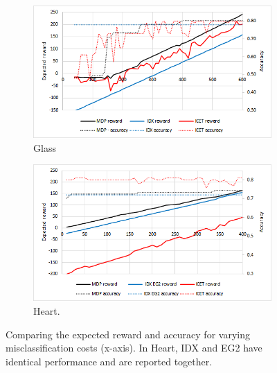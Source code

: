 \documentclass[letterpaper]{article}
\theoremstyle{definition}
\begin{document}
\begin{figure}[!ht]
	\centering
	\begin{subfigure}[t]{0.5\textwidth}\vskip 0pt
		\centering
		\includegraphics[scale=0.55]{Glass}
		\caption{Glass}\label{fig:Glass}
	\end{subfigure}
    \quad

	\begin{subfigure}[t]{0.5\textwidth}\vskip 0pt
		\centering
		\includegraphics[scale=0.55]{Heart}
		\caption{Heart.}\label{fig:Heart}
	\end{subfigure}

    \caption{Comparing the expected reward and accuracy for varying misclassification costs (x-axis). In Heart, IDX and EG2 have identical performance and are reported together.}
    \label{fig:RewardVsAccuracy}
\end{figure}
\end{document}
